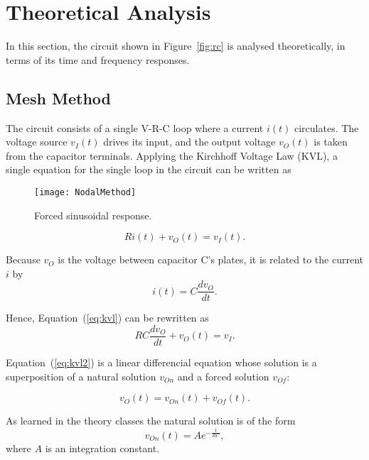 \section{Theoretical Analysis}
\label{sec:analysis}

In this section, the circuit shown in Figure~\ref{fig:rc} is analysed
theoretically, in terms of its time and frequency responses.

\subsection{Mesh Method}

The circuit consists of a single V-R-C loop where a current $i(t)$ circulates. The
voltage source $v_I(t)$ drives its input, and the output voltage $v_O(t)$ is taken from
the capacitor terminals. Applying the Kirchhoff Voltage Law (KVL), a single
equation for the single loop in the circuit can be written as

\begin{figure}[h] \centering
	\texttt{[image: NodalMethod]}
	\caption{Forced sinusoidal response.}
	\label{fig:forced}
\end{figure}


\begin{equation}
  Ri(t) + v_O(t) = v_I(t).
  \label{eq:kvl}
\end{equation}

Because $v_O$ is the voltage between capacitor C's plates, it is related to the
current $i$ by
\begin{equation}
  i(t) = C\frac{dv_O}{dt}.
\end{equation}

Hence, Equation~(\ref{eq:kvl}) can be rewritten as
\begin{equation}
  RC\frac{dv_O}{dt} + v_O(t) = v_I.
  \label{eq:kvl2}
\end{equation}

Equation~(\ref{eq:kvl2}) is a linear differencial equation whose solution is a
superposition of a natural solution $v_{On}$ and a forced solution $v_{Of}$:

\begin{equation}
  v_O(t) = v_{On}(t) + v_{Of}(t).
  \label{eq:vo_sol}
\end{equation}

As learned in the theory classes the natural solution is of the form
\begin{equation}
  v_{On}(t) = Ae^{-\frac{t}{RC}},
  \label{eq:vo_nat}
\end{equation}
where $A$ is an integration constant.


